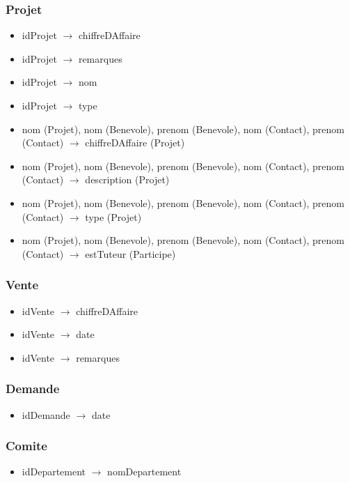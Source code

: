 \subsubsection*{Projet}
\begin{itemize}
\item[] idProjet $\rightarrow$ chiffreDAffaire
\item[] idProjet $\rightarrow$ remarques
\item[] idProjet $\rightarrow$ nom
\item[] idProjet $\rightarrow$ type
\item[]	nom (Projet), nom (Benevole), prenom (Benevole), nom (Contact), prenom (Contact) $\rightarrow$ chiffreDAffaire (Projet)
\item[]	nom (Projet), nom (Benevole), prenom (Benevole), nom (Contact), prenom (Contact) $\rightarrow$ description (Projet)
\item[]	nom (Projet), nom (Benevole), prenom (Benevole), nom (Contact), prenom (Contact) $\rightarrow$ type (Projet)
\item[]	nom (Projet), nom (Benevole), prenom (Benevole), nom (Contact), prenom (Contact) $\rightarrow$ estTuteur (Participe)
\end{itemize}

\subsubsection*{Vente}
\begin{itemize}
\item[]	idVente $\rightarrow$ chiffreDAffaire
\item[]	idVente $\rightarrow$ date
\item[]	idVente $\rightarrow$ remarques
\end{itemize}

\subsubsection*{Demande}
\begin{itemize}
\item[] idDemande $\rightarrow$ date
\end{itemize}

\subsubsection*{Comite}
\begin{itemize}
\item[] idDepartement $\rightarrow$ nomDepartement
\end{itemize}

